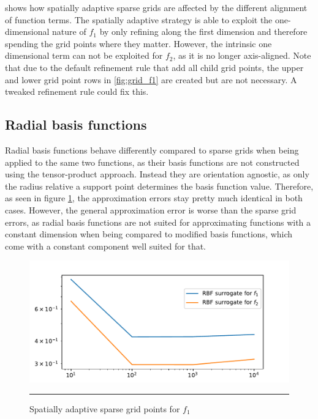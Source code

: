 \documentclass[
  a4paper,  %
  twoside,  %
  bibliography=totoc,
  headsepline,
  cleardoublepage=empty,
  parskip=half,
  draft=false
]{scrbook}
\newcommand{\delimit}{{\color{charcoal}\noindent\rule{\textwidth}{1pt}}}
\begin{document}
 shows how spatially adaptive sparse grids are affected by the different alignment of function terms.
The spatially adaptive strategy is able to exploit the one-dimensional nature of $f_1$ by only refining along the first dimension and therefore spending the grid points where they matter.
However, the intrinsic one dimensional term can not be exploited for $f_2$, as it is no longer axis-aligned.
Note that due to the default refinement rule that add all child grid points, the upper and lower grid point rows in \cref{fig:grid_f1} are created but are not necessary.
A tweaked refinement rule could fix this.

\subsection{Radial basis functions}
Radial basis functions behave differently compared to sparse grids when being applied to the same two functions, as their basis functions are not constructed using the tensor-product approach.
Instead they are orientation agnostic, as only the radius relative a support point determines the basis function value.
Therefore, as seen in figure \cref{fig:grid_rbf_errors}, the approximation errors stay pretty much identical in both cases.
However, the general approximation error is worse than the sparse grid errors, as radial basis functions are not suited for approximating functions with a constant dimension when being compared to modified basis functions, which come with a constant component well suited for that.

\newpage
\begin{mdframed}[style=style]
\begin{figure}[H]
  \centering
  \includegraphics[width=.8\linewidth]{graphics/rbf_errors}
  \caption{Spatially adaptive sparse grid points for $f_1$}
  \delimit
{}
  \label{fig:grid_rbf_errors}
\end{figure}
\end{mdframed}
\end{document}
